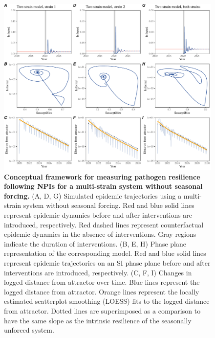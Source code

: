 \documentclass[12pt]{article}
\begin{document}
\begin{figure}[!th]
\includegraphics[width=\textwidth]{../figure2/figure2_multi_noseas.pdf}
\caption{
\textbf{Conceptual framework for measuring pathogen resilience following NPIs for a multi-strain system without seasonal forcing.}
(A, D, G) Simulated epidemic trajectories using a multi-strain system without seasonal forcing.
Red and blue solid lines represent epidemic dynamics before and after interventions are introduced, respectively.
Red dashed lines represent counterfactual epidemic dynamics in the absence of interventions.
Gray regions indicate the duration of interventions.
(B, E, H) Phase plane representation of the corresponding model.
Red and blue solid lines represent epidemic trajectories on an SI phase plane before and after interventions are introduced, respectively.
(C, F, I) Changes in logged distance from attractor over time.
Blue lines represent the logged distance from attractor.
Orange lines represent the locally estimated scatterplot smoothing (LOESS) fits to the logged distance from attractor.
Dotted lines are superimposed as a comparison to have the same slope as the intrinsic resilience of the seasonally unforced system.
}
\end{figure}

\pagebreak
\end{document}
